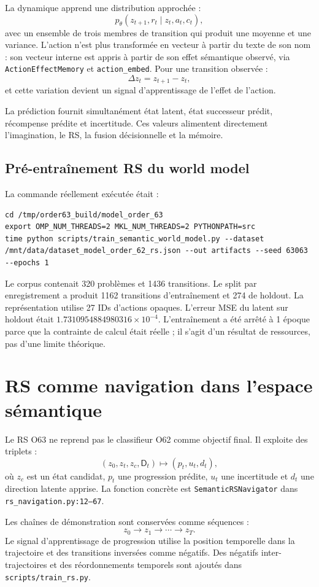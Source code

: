 \documentclass[11pt,a4paper]{article}
\newcommand{\code}[1]{\texttt{#1}}
\newcommand{\Def}{\mathsf{D}}
\begin{document}
La dynamique apprend une distribution approchée :
\[
p_\theta(z_{t+1},r_t\mid z_t,a_t,c_t),
\]
avec un ensemble de trois membres de transition qui produit une moyenne et une variance. L’action n’est plus transformée en vecteur à partir du texte de son nom : son vecteur interne est appris à partir de son effet sémantique observé, via \code{ActionEffectMemory} et \code{action\_embed}. Pour une transition observée :
\[
\Delta z_t=z_{t+1}-z_t,
\]
et cette variation devient un signal d’apprentissage de l’effet de l’action.

La prédiction fournit simultanément état latent, état successeur prédit, récompense prédite et incertitude. Ces valeurs alimentent directement l’imagination, le RS, la fusion décisionnelle et la mémoire.

\subsection{Pré-entraînement RS du world model}
La commande réellement exécutée était :
\begin{lstlisting}
cd /tmp/order63_build/model_order_63
export OMP_NUM_THREADS=2 MKL_NUM_THREADS=2 PYTHONPATH=src
time python scripts/train_semantic_world_model.py --dataset /mnt/data/dataset_model_order_62_rs.json --out artifacts --seed 63063 --epochs 1
\end{lstlisting}
Le corpus contenait 320 problèmes et 1436 transitions. Le split par enregistrement a produit 1162 transitions d’entraînement et 274 de holdout. La représentation utilise 27 IDs d’actions opaques. L’erreur MSE du latent sur holdout était $1.7310954884980316\times10^{-4}$. L’entraînement a été arrêté à 1 époque parce que la contrainte de calcul était réelle ; il s’agit d’un résultat de ressources, pas d’une limite théorique.

\section{RS comme navigation dans l’espace sémantique}
Le RS O63 ne reprend pas le classifieur O62 comme objectif final. Il exploite des triplets :
\[
(z_0,z_t,z_c,\Def_t) \mapsto (p_t,u_t,d_t),
\]
où $z_c$ est un état candidat, $p_t$ une progression prédite, $u_t$ une incertitude et $d_t$ une direction latente apprise. La fonction concrète est \code{SemanticRSNavigator} dans \code{rs\_navigation.py:12--67}.

Les chaînes de démonstration sont conservées comme séquences :
\[
z_0\to z_1\to\cdots\to z_T.
\]
Le signal d’apprentissage de progression utilise la position temporelle dans la trajectoire et des transitions inversées comme négatifs. Des négatifs inter-trajectoires et des réordonnements temporels sont ajoutés dans \code{scripts/train\_rs.py}.
\end{document}
